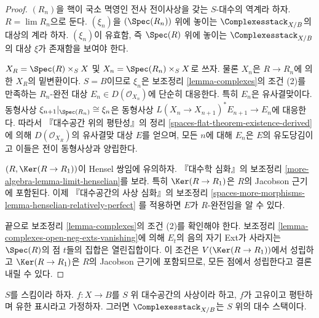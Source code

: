 \begin{proof}
$(R_n)$을 핵이 국소 멱영인 전사 전이사상을 갖는 $S$-대수의 역계라 하자.
$R = \lim R_n$으로 둔다. $(\xi_n)$을 $(\Spec(R_n))$ 위에 놓이는
$\Complexesstack_{X/B}$의 대상의 계라 하자. $(\xi_n)$이 유효함, 즉
$\Spec(R)$ 위에 놓이는 $\Complexesstack_{X/B}$의 대상 $\xi$가 존재함을
보여야 한다.

\medskip\noindent
$X_R = \Spec(R) \times_S X$ 및 $X_n = \Spec(R_n) \times_S X$로 쓰자. 물론
$X_n$은 $R \to R_n$에 의한 $X_R$의 밑변환이다. $S = B$이므로 $\xi_n$은
보조정리 \ref{lemma-complexes}의 조건 (2)를 만족하는 $R_n$-완전 대상
$E_n \in D(\mathcal{O}_{X_n})$에 단순히 대응한다. 특히 $E_n$은 유사결맞이다.
동형사상 $\xi_{n + 1}|_{\Spec(R_n)} \cong \xi_n$은 동형사상
$L(X_n \to X_{n + 1})^*E_{n + 1} \to E_n$에 대응한다. 따라서
『대수공간 위의 평탄성』의 정리 \ref{spaces-flat-theorem-existence-derived}에
의해 $D(\mathcal{O}_{X_R})$의 유사결맞 대상 $E$를 얻으며, 모든 $n$에 대해
$E_n$은 $E$의 유도당김이고 이들은 전이 동형사상과 양립한다.

\medskip\noindent
$(R, \Ker(R \to R_1))$이 Hensel 쌍임에 유의하자. 『대수학 심화』의 보조정리
\ref{more-algebra-lemma-limit-henselian}를 보라. 특히 $\Ker(R \to R_1)$은
$R$의 Jacobson 근기에 포함된다. 이제 『대수공간의 사상 심화』의 보조정리
\ref{spaces-more-morphisms-lemma-henselian-relatively-perfect}
를 적용하면 $E$가 $R$-완전임을 알 수 있다.

\medskip\noindent
끝으로 보조정리 \ref{lemma-complexes}의 조건 (2)를 확인해야 한다. 보조정리
\ref{lemma-complexes-open-neg-exts-vanishing}에 의해 $E_t$의 음의 자기 Ext가
사라지는 $\Spec(R)$의 점 $t$들의 집합은 열린집합이다. 이 조건은
$V(\Ker(R \to R_1))$에서 성립하고 $\Ker(R \to R_1)$은 $R$의 Jacobson
근기에 포함되므로, 모든 점에서 성립한다고 결론 내릴 수 있다.
\end{proof}

\begin{theorem}
\label{theorem-complexes-algebraic}
\begin{reference}
\cite{lieblich-complexes}
\end{reference}
$S$를 스킴이라 하자.
$f : X \to B$를 $S$ 위 대수공간의 사상이라 하고, $f$가 고유이고 평탄하며
유한 표시라고 가정하자. 그러면 $\Complexesstack_{X/B}$는 $S$ 위의 대수
스택이다.
\end{theorem}

